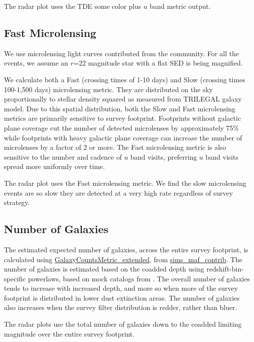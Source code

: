 The radar plot uses the TDE some color plus $u$ band metric output.

\subsection{Fast Microlensing}

We use microlensing light curves contributed from the community. For all the events, we assume an $r$=22 magnitude star with a flat SED is being magnified. 

We calculate both a Fast (crossing times of 1-10 days) and Slow (crossing times 100-1,500 days) microlensing metric. They are distributed on the sky proportionally to stellar density squared as measured from TRILEGAL galaxy model.  Due to this spatial distribution, both the Slow and Fast microlensing metrics are primarily sensitive to survey footprint. Footprints without galactic plane coverage cut the number of detected microlenses by approximately 75\% while footprints with heavy galactic plane coverage can increase the number of microlenses by a factor of 2 or more. The Fast microlensing metric is also sensitive to the number and cadence of $u$ band visits, preferring $u$ band visits spread more uniformly over time. 

The radar plot uses the Fast microlensing metric. We find the slow microlensing events are so slow they are detected at a very high rate regardless of survey strategy. 

\subsection{Number of Galaxies}

The estimated expected number of galaxies, across the entire survey footprint, is calculated using \href{https://github.com/LSST-nonproject/sims_maf_contrib/blob/master/mafContrib/LSSObsStrategy/galaxyCountsMetric_extended.py#L26}{GalaxyCountsMetric\_extended}, from \href{https://github.com/LSST-nonproject/sims_maf_contrib}{sims\_maf\_contrib}. The number of galaxies is estimated based on the coadded depth using redshift-bin-specific powerlaws, based on mock catalogs from \citet{2003MNRAS.343..796P}. The overall number of galaxies tends to increase with increased depth, and more so when more of the survey footprint is distributed in lower dust extinction areas. The number of galaxies also increases when the survey filter distribution is redder, rather than bluer.

The radar plots use the total number of galaxies down to the coadded limiting magnitude over the entire survey footprint.


